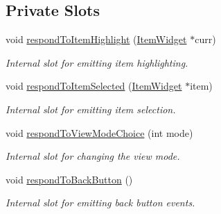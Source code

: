 \subsection*{Private Slots}
\begin{DoxyCompactItemize}
\item 
void \hyperlink{class_u_i_1_1_folder_pane_a2dfe63445341434a9ec2748006eb4ad0}{respond\-To\-Item\-Highlight} (\hyperlink{class_u_i_1_1_item_widget}{Item\-Widget} $\ast$curr)
\begin{DoxyCompactList}\small\item\em Internal slot for emitting item highlighting. \end{DoxyCompactList}\item 
void \hyperlink{class_u_i_1_1_folder_pane_a7bb8a724380fd4b0580b25d47986356d}{respond\-To\-Item\-Selected} (\hyperlink{class_u_i_1_1_item_widget}{Item\-Widget} $\ast$item)
\begin{DoxyCompactList}\small\item\em Internal slot for emitting item selection. \end{DoxyCompactList}\item 
void \hyperlink{class_u_i_1_1_folder_pane_a15f45b2f61eb8b70e35c55f8eba4ce50}{respond\-To\-View\-Mode\-Choice} (int mode)
\begin{DoxyCompactList}\small\item\em Internal slot for changing the view mode. \end{DoxyCompactList}\item 
\hypertarget{class_u_i_1_1_folder_pane_a6b4e5b8f3af5ee00c9492a95f1b64a78}{void \hyperlink{class_u_i_1_1_folder_pane_a6b4e5b8f3af5ee00c9492a95f1b64a78}{respond\-To\-Back\-Button} ()}\label{class_u_i_1_1_folder_pane_a6b4e5b8f3af5ee00c9492a95f1b64a78}

\begin{DoxyCompactList}\small\item\em Internal slot for emitting back button events. \end{DoxyCompactList}\end{DoxyCompactItemize}
